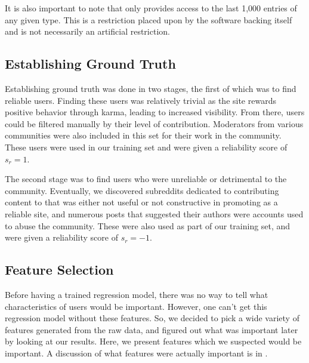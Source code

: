 It is also important to note that \reddit{} only provides access to the last
1,000 entries of any given type. This is a restriction placed upon \reddit{} by
the software backing \reddit{} itself and is not necessarily an artificial
restriction.


\subsection{Establishing Ground Truth} %
\label{sub:establishing_ground_truth}
Establishing ground truth was done in two stages, the first of which was to find
reliable users. Finding these users was relatively trivial as the site rewards
positive behavior through karma, leading to increased visibility. From there,
users could be filtered manually by their level of contribution. Moderators from
various communities were also included in this set for their work in the
\reddit{} community. These users were used in our training set and were given a
reliability score of $s_r = 1$.

The second stage was to find users who were unreliable or detrimental to the
community. Eventually, we discovered subreddits dedicated to contributing
content to \reddit{} that was either not useful or not constructive in promoting
\reddit{} as a reliable site, and numerous posts that suggested their authors
were accounts used to abuse the community. These were also used as part of our
training set, and were given a reliability score of $s_r = -1$.


\subsection{Feature Selection} %
\label{sub:feature_selection}

Before having a trained regression model, there was no way to tell what
characteristics of \reddit{} users would be important. However, one can't get
this regression model without these features. So, we decided to pick a wide
variety of features generated from the raw data, and figured out what was
important later by looking at our results. Here, we present features which we
suspected would be important. A discussion of what features were actually
important is in .

